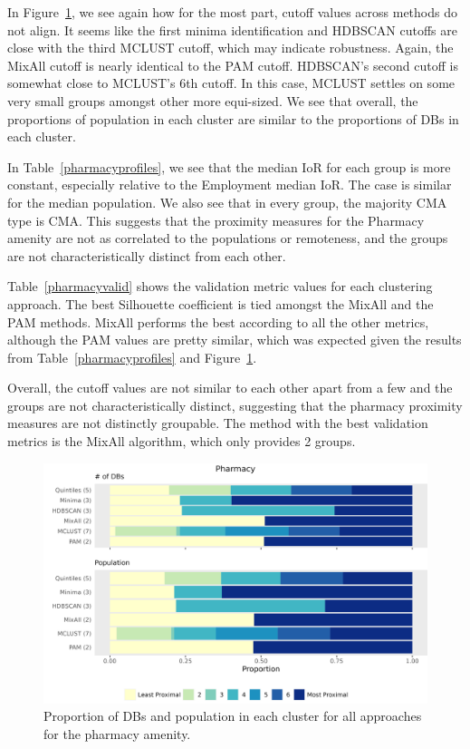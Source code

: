 \documentclass[11pt, a4paper]{article}
\begin{document}
In Figure~\ref{pharmacybarplot}, we see again how for the most part, cutoff values across methods do not align. It seems like the first minima identification and HDBSCAN cutoffs are close with the third MCLUST cutoff, which may indicate robustness. Again, the MixAll cutoff is nearly identical to the PAM cutoff. HDBSCAN's second cutoff is somewhat close to MCLUST's 6th cutoff. In this case, MCLUST settles on some very small groups amongst other more equi-sized. We see that overall, the proportions of population in each cluster are similar to the proportions of DBs in each cluster.
\par
In Table~\ref{pharmacyprofiles}, we see that the median IoR for each group is more constant, especially relative to the Employment median IoR. The case is similar for the median population. We also see that in every group,  the majority CMA type is CMA. This suggests that the proximity measures for the Pharmacy amenity are not as correlated to the populations or remoteness, and the groups are not characteristically distinct from each other.
\par
Table~\ref{pharmacyvalid} shows the validation metric values for each clustering approach. The best Silhouette coefficient is tied amongst the MixAll and the PAM methods. MixAll performs the best according to all the other metrics, although the PAM values are pretty similar, which was expected given the results from Table~\ref{pharmacyprofiles} and Figure~\ref{pharmacybarplot}.
\par
Overall, the cutoff values are not similar to each other apart from a few and the groups are not characteristically distinct, suggesting that the pharmacy proximity measures are not distinctly groupable. The method with the best validation metrics is the MixAll algorithm, which only provides 2 groups.





\begin{figure}[H]
\centering
\includegraphics[width=\textwidth]{./barplot_comparison/Pharmacy_barplot.png}
\caption[Pharmacy profile barplot]{Proportion of DBs and population in each cluster for all approaches for the pharmacy amenity.}\label{pharmacybarplot}
\end{figure}
\end{document}
